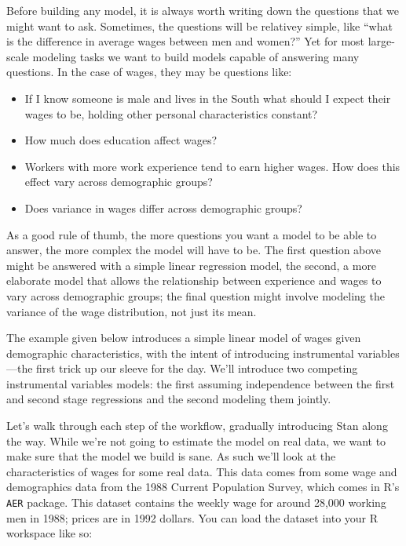 \documentclass[]{book}
\providecommand{\tightlist}{%
  \setlength{\itemsep}{0pt}\setlength{\parskip}{0pt}}
\begin{document}
Before building any model, it is always worth writing down the questions
that we might want to ask. Sometimes, the questions will be relativey
simple, like ``what is the difference in average wages between men and
women?'' Yet for most large-scale modeling tasks we want to build models
capable of answering many questions. In the case of wages, they may be
questions like:

\begin{itemize}
\tightlist
\item
  If I know someone is male and lives in the South what should I expect
  their wages to be, holding other personal characteristics constant?
\item
  How much does education affect wages?
\item
  Workers with more work experience tend to earn higher wages. How does
  this effect vary across demographic groups?
\item
  Does variance in wages differ across demographic groups?
\end{itemize}

As a good rule of thumb, the more questions you want a model to be able
to answer, the more complex the model will have to be. The first
question above might be answered with a simple linear regression model,
the second, a more elaborate model that allows the relationship between
experience and wages to vary across demographic groups; the final
question might involve modeling the variance of the wage distribution,
not just its mean.

The example given below introduces a simple linear model of wages given
demographic characteristics, with the intent of introducing instrumental
variables---the first trick up our sleeve for the day. We'll introduce
two competing instrumental variables models: the first assuming
independence between the first and second stage regressions and the
second modeling them jointly.

Let's walk through each step of the workflow, gradually introducing Stan
along the way. While we're not going to estimate the model on real data,
we want to make sure that the model we build is sane. As such we'll look
at the characteristics of wages for some real data. This data comes from
some wage and demographics data from the 1988 Current Population Survey,
which comes in R's \texttt{AER} package. This dataset contains the
weekly wage for around 28,000 working men in 1988; prices are in 1992
dollars. You can load the dataset into your R workspace like so:
\end{document}
